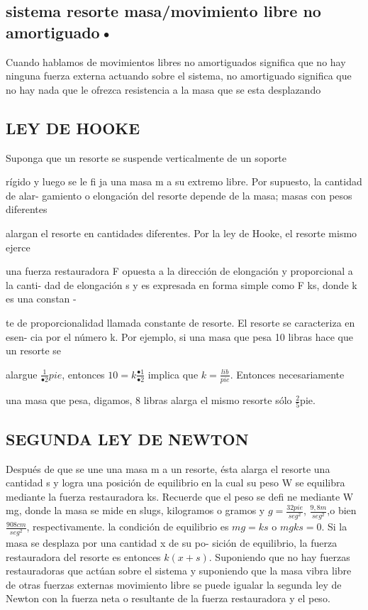 \documentclass[12pt]{book}
\begin{document}
\subsection*{sistema resorte masa/movimiento libre no amortiguado•} 
Cuando hablamos de movimientos libres no amortiguados significa que no hay ninguna fuerza externa actuando sobre el sistema, no amortiguado significa que no hay nada que le ofrezca resistencia  a la masa que se esta desplazando 
\subsection{LEY DE HOOKE}
 Suponga que un resorte se suspende verticalmente de un soporte

rígido y luego se le fi ja una masa m a su extremo libre. Por supuesto, la cantidad de alar-
gamiento o elongación del resorte depende de la masa; masas con pesos diferentes

alargan el resorte en cantidades diferentes. Por la ley de Hooke, el resorte mismo ejerce

una fuerza restauradora F opuesta a la dirección de elongación y proporcional a la canti-
dad de elongación s y es expresada en forma simple como F  ks, donde k es una constan -

te de proporcionalidad llamada constante de resorte. El resorte se caracteriza en esen-
cia por el número k. Por ejemplo, si una masa que pesa 10 libras hace que un resorte se

alargue $\frac{1}{•2} pie$, entonces $10 = k \frac{•1}{•2}$  implica que $ k = \frac{lib}{pie}.$ Entonces necesariamente

una masa que pesa, digamos, 8 libras alarga el mismo resorte sólo $\frac{2}{5}$pie.
\subsection{SEGUNDA LEY DE NEWTON}
 Después de que se une una masa m a un resorte, ésta alarga el resorte una cantidad s y logra una posición de equilibrio en la cual su peso W se
equilibra mediante la fuerza restauradora ks. Recuerde que el peso se defi ne mediante
W  mg, donde la masa se mide en slugs, kilogramos o gramos y $g= \frac{32pie}{seg^{2}}$, $\frac{9,8m}{seg^{2}}$,o bien $\frac{908cm}{seg^{2}}$, respectivamente. la condición de equilibrio es $mg = ks$ o $mg  ks = 0$. Si la masa se desplaza por una cantidad x de su po-
sición de equilibrio, la fuerza restauradora del resorte es entonces $k(x + s)$. Suponiendo
que no hay fuerzas restauradoras que actúan sobre el sistema y suponiendo que la masa
vibra libre de otras fuerzas externas movimiento libre se puede igualar la segunda
ley de Newton con la fuerza neta o resultante de la fuerza restauradora y el peso.
\end{document}
